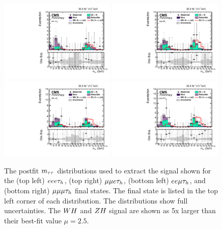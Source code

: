 \begin{figure}[h!]
 \begin{center}
  \includegraphics[width=0.49\textwidth]{higgs_to_taus_vh/plots/zh/eeet_postfit.pdf}
  \includegraphics[width=0.49\textwidth]{higgs_to_taus_vh/plots/zh/emmt_postfit.pdf}
  \includegraphics[width=0.49\textwidth]{higgs_to_taus_vh/plots/zh/eemt_postfit.pdf}
  \includegraphics[width=0.49\textwidth]{higgs_to_taus_vh/plots/zh/mmmt_postfit.pdf}
 \end{center}
 \caption{The postfit $m_{\tau\tau}$ distributions used to extract the signal shown
  for the (top left) $eee\tau_{h}$, (top right) $\mu\mu e\tau_{h}$, 
  (bottom left) $ee\mu\tau_{h}$, and (bottom right) $\mu\mu\mu\tau_{h}$
  final states. The final state is listed in the
  top left corner of each distribution.
  The distributions show full uncertainties.
  The $WH$ and $ZH$ signal are shown as 5x larger than their best-fit
  value $\mu = 2.5$.
 }
 \label{fig:zh_all_eight1}
\end{figure}

